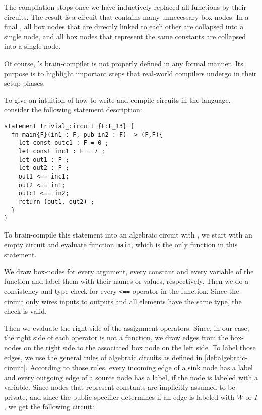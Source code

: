 The compilation stops once we have inductively replaced all functions by their circuits. The result is a circuit that contains many unnecessary box nodes. In a final , all box nodes that are directly linked to each other are collapsed into a single node, and all box nodes that represent the same constants are collapsed into a single node. 

Of course, 's brain-compiler is not properly defined in any formal manner. Its purpose is to highlight important steps that real-world compilers undergo in their setup phases. 
\begin{example}\label{ex:trivial-circuit} To give an intuition of how to write and compile circuits in the  language, consider the following statement description:
\begin{lstlisting}
statement trivial_circuit {F:F_13} {
  fn main{F}(in1 : F, pub in2 : F) -> (F,F){
    let const outc1 : F = 0 ;   
    let const inc1 : F = 7 ;
    let out1 : F ;
    let out2 : F ;
    out1 <== inc1;
    out2 <== in1;
    outc1 <== in2;
    return (out1, out2) ;
  }
}
\end{lstlisting} 
To brain-compile this statement into an algebraic circuit with , we start with an empty circuit and evaluate function \texttt{main}, which is the only function in this statement. 

We draw box-nodes for every argument, every constant and every variable of the function and label them with their names or values, respectively.  Then we do a consistency and type check for every \texttt{<==} operator in the function. Since the circuit only wires inputs to outputs and all elements have the same type, the check is valid.

Then we evaluate the right side of the assignment operators. Since, in our case, the right side of each operator is not a function, we draw edges from the box-nodes on the right side to the associated box node on the left side. To label those edges, we use the general rules of algebraic circuits as defined in \ref{def:algebraic-circuit}. According to those rules, every incoming edge of a sink node has a label and every outgoing edge of a source node has a label, if the node is labeled with a variable. Since nodes that represent constants are implicitly assumed to be private, and since the public specifier determines if an edge is labeled with $W$ or $I$, we get the following circuit:
\begin{center}
\end{center}
\end{example}
